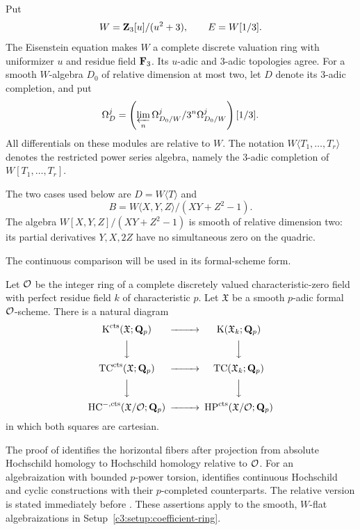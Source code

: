 \begin{setup}\label{c3:setup:coefficient-ring}
Put
\[
 W=\mathbf{Z}_3[u]/(u^2+3),\qquad E=W[1/3].
\]
The Eisenstein equation makes $W$ a complete discrete valuation ring
with uniformizer $u$ and residue field $\mathbf{F}_3$.
Its $u$-adic and $3$-adic topologies agree.
For a smooth $W$-algebra $D_0$ of relative dimension at most two, let
$D$ denote its $3$-adic completion, and put
\[
 \Omega_D^j=
 \left(\varprojlim_n\Omega^j_{D_0/W}/3^n\Omega^j_{D_0/W}\right)[1/3].
\]
All differentials on these modules are relative to $W$.
The notation $W\langle T_1,\ldots,T_r\rangle$ denotes the restricted
power series algebra, namely the $3$-adic completion of
$W[T_1,\ldots,T_r]$.

The two cases used below are $D=W\langle T\rangle$ and
\[
 B=W\langle X,Y,Z\rangle/(XY+Z^2-1).
\]
The algebra $W[X,Y,Z]/(XY+Z^2-1)$ is smooth of relative dimension two:
its partial derivatives $Y,X,2Z$ have no simultaneous zero on the
quadric.
\end{setup}

The continuous comparison will be used in its formal-scheme form.

\begin{proposition}\label{c3:prop:continuous-comparison}
Let $\mathcal{O}$ be the integer ring of a complete discretely valued
characteristic-zero field with perfect residue field $k$ of
characteristic $p$. Let $\mathfrak X$ be a smooth $p$-adic formal
$\mathcal{O}$-scheme. There is a natural diagram
\begin{equation}\label{c3:eq:continuous-comparison}
\begin{CD}
 \CthreeK^\Cthreects(\mathfrak X;\CthreeQ_p)
     @>>> \CthreeK(\mathfrak X_k;\CthreeQ_p)\\
 @VVV @VVV\\
 \CthreeTC^\Cthreects(\mathfrak X;\CthreeQ_p)
     @>>> \CthreeTC(\mathfrak X_k;\CthreeQ_p)\\
 @VVV @VVV\\
 \CthreeHC^{-,\Cthreects}(\mathfrak X/\CthreecO;\CthreeQ_p)
     @>>> \CthreeHP^\Cthreects(\mathfrak X/\CthreecO;\CthreeQ_p)
\end{CD}
\end{equation}
in which both squares are cartesian.
\end{proposition}

The proof of \cite[Proposition~4.10]{AMMN} identifies the horizontal
fibers after projection from absolute Hochschild homology to
Hochschild homology relative to $\mathcal{O}$.
For an algebraization with bounded $p$-power torsion,
\cite[Proposition~4.2]{AMMN} identifies continuous Hochschild and cyclic
constructions with their $p$-completed counterparts.
The relative version is stated immediately before
\cite[Proposition~4.10]{AMMN}.
These assertions apply to the smooth, $W$-flat algebraizations in
Setup~\ref{c3:setup:coefficient-ring}.

